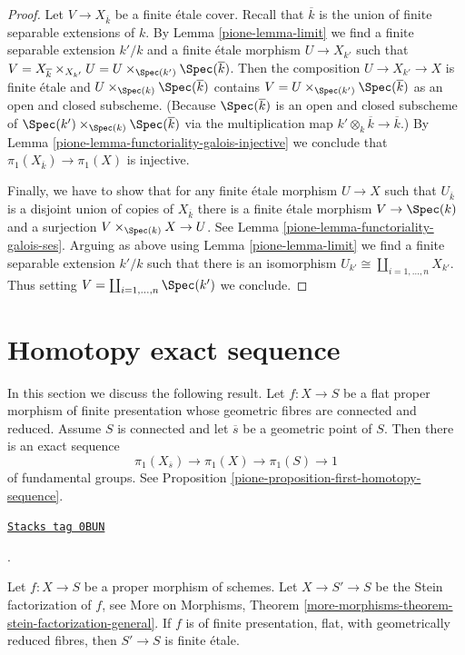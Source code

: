 \begin{proof}
\medskip\noindent
Let $V \to X_{\overline{k}}$ be a finite \'etale cover. Recall that
$\overline{k}$ is the union of finite separable extensions of $k$.
By Lemma \ref{pione-lemma-limit} we find a finite separable extension $k'/k$
and a finite \'etale morphism $U \to X_{k'}$ such that
$V = X_{\overline{k}} \times_{X_{k'}} U =
U \times_{\Spec(k')} \Spec(\overline{k})$.
Then the composition $U \to X_{k'} \to X$ is finite \'etale
and $U \times_{\Spec(k)} \Spec(\overline{k})$
contains $V = U \times_{\Spec(k')} \Spec(\overline{k})$
as an open and closed subscheme. (Because $\Spec(\overline{k})$
is an open and closed subscheme of
$\Spec(k') \times_{\Spec(k)} \Spec(\overline{k})$ via
the multiplication map $k' \otimes_k \overline{k} \to \overline{k}$.) By
Lemma \ref{pione-lemma-functoriality-galois-injective}
we conclude that $\pi_1(X_{\overline{k}}) \to \pi_1(X)$ is injective.

\medskip\noindent
Finally, we have to show that for any finite \'etale morphism
$U \to X$ such that $U_{\overline{k}}$ is a disjoint union
of copies of $X_{\overline{k}}$ there is a finite \'etale
morphism $V \to \Spec(k)$ and a surjection $V \times_{\Spec(k)} X \to U$.
See Lemma \ref{pione-lemma-functoriality-galois-ses}.
Arguing as above using Lemma \ref{pione-lemma-limit}
we find a finite separable extension $k'/k$
such that there is an isomorphism
$U_{k'} \cong \coprod_{i = 1, \ldots, n} X_{k'}$.
Thus setting $V = \coprod_{i = 1, \ldots, n} \Spec(k')$
we conclude.
\end{proof}

\section{Homotopy exact sequence}
\label{pione-section-homotopy-exact-sequence}
In this section we discuss the following result.
Let $f : X \to S$ be a flat proper morphism of
finite presentation whose
geometric fibres are connected and reduced.
Assume $S$ is connected and let $\overline{s}$
be a geometric point of $S$. Then there is an exact
sequence
$$
\pi_1(X_{\overline{s}}) \to \pi_1(X) \to \pi_1(S) \to 1
$$
of fundamental groups. See
Proposition \ref{pione-proposition-first-homotopy-sequence}.

\begin{lemma}
\label{pione-lemma-stein-factorization-etale}
\href{https://stacks.math.columbia.edu/tag/0BUN}{\texttt{Stacks tag 0BUN}}

\begin{reference}
\cite[Expose X, Proposition 1.2, p. 262]{SGA1}.
\end{reference}
Let $f : X \to S$ be a proper morphism of schemes.
Let $X \to S' \to S$ be the Stein factorization of $f$, see
More on Morphisms, Theorem
\ref{more-morphisms-theorem-stein-factorization-general}.
If $f$ is of finite presentation, flat, with geometrically
reduced fibres, then $S' \to S$ is finite \'etale.
\end{lemma}

